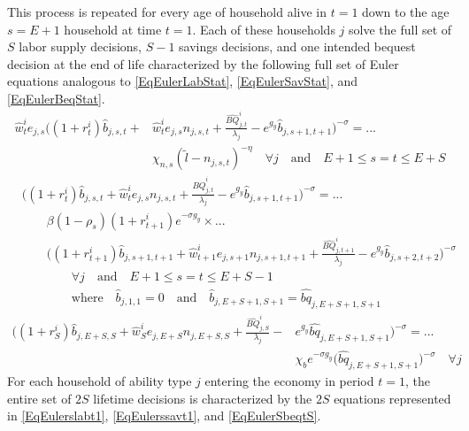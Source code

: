 \documentclass[letterpaper,12pt]{article}
\theoremstyle{definition}
\begin{document}
  This process is repeated for every age of household alive in $t=1$ down to the age $s=E+1$ household at time $t=1$. Each of these households $j$ solve the full set of $S$ labor supply decisions, $S-1$ savings decisions, and one intended bequest decision at the end of life characterized by the following full set of Euler equations analogous to \eqref{EqEulerLabStat}, \eqref{EqEulerSavStat}, and \eqref{EqEulerBeqStat}.
  \begin{equation}\label{EqEulerslabt1}
    \begin{split}
      \hat{w}_t^i e_{j,s}\biggl(\left(1+r_t^i\right)\hat{b}_{j,s,t} + &\hat{w}_t^i e_{j,s}n_{j,s,t} + \frac{\hat{BQ}_{j,t}^i}{\lambda_j} - e^{g_y}\hat{b}_{j,s+1,t+1}\biggr)^{-\sigma} = ... \\
      &\chi_{n,s}(\tilde{l} - n_{j,s,t})^{-\eta} \quad\forall j \quad\text{and}\quad E+1\leq s=t \leq E+S
    \end{split}
  \end{equation}
  \begin{equation}\label{EqEulerssavt1}
    \begin{split}
      &\biggl(\left(1+r_t^i\right)\hat{b}_{j,s,t} + \hat{w}_t^i e_{j,s}n_{j,s,t} + \frac{\hat{BQ}_{j,t}^i}{\lambda_j} - e^{g_y}\hat{b}_{j,s+1,t+1}\biggr)^{-\sigma} = ... \\
      &\quad\quad\beta(1-\rho_{s})(1+r_{t+1}^i)e^{-\sigma g_y}\times ... \\
      &\quad\quad \biggl(\left(1+r_{t+1}^i\right)\hat{b}_{j,s+1,t+1} + \hat{w}_{t+1}^i e_{j,s+1}n_{j,s+1,t+1} + \frac{\hat{BQ}_{j,t+1}^i}{\lambda_j} - e^{g_y}\hat{b}_{j,s+2,t+2}\biggr)^{-\sigma} \\
      &\quad\quad\quad\quad\forall j \quad\text{and}\quad E+1\leq s=t \leq E+S-1 \\
      &\quad\quad\quad\quad\text{where}\quad \hat{b}_{j,1,1}=0 \quad\text{and}\quad \hat{b}_{j,E+S+1,S+1} = \hat{bq}_{j,E+S+1,S+1}
    \end{split}
  \end{equation}
  \begin{equation}\label{EqEulerSbeqtS}
    \begin{split}
      \biggl(\left(1+r_S^i\right)\hat{b}_{j,E+S,S} + \hat{w}_S^i e_{j,E+S}n_{j,E+S,S} + \frac{\hat{BQ}_{j,S}^i}{\lambda_j} - &e^{g_y}\hat{bq}_{j,E+S+1,S+1}\biggr)^{-\sigma} = ... \\
      &\chi_b e^{-\sigma g_y}\bigl(\hat{bq}_{j,E+S+1,S+1}\bigr)^{-\sigma} \quad\forall j
    \end{split}
  \end{equation}
  For each household of ability type $j$ entering the economy in period $t=1$, the entire set of $2S$ lifetime decisions is characterized by the $2S$ equations represented in \eqref{EqEulerslabt1}, \eqref{EqEulerssavt1}, and \eqref{EqEulerSbeqtS}.
\end{document}
